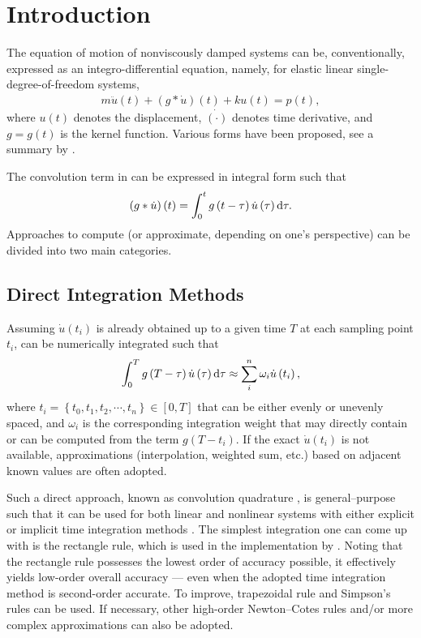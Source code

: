 \section{Introduction}
The equation of motion of nonviscously damped systems can be, conventionally, expressed as an integro-differential equation, namely, for elastic linear single-degree-of-freedom systems,
\begin{gather}\label{eq:single_eom}
m\ddot{u}\left(t\right)+\left(g*\dot{u}\right)\left(t\right)+ku\left(t\right)=p\left(t\right),
\end{gather}
where $u(t)$ denotes the displacement, $\dot{(\cdot)}$ denotes time derivative, and $g=g(t)$ is the kernel function. Various forms have been proposed, see a summary by \citet[][Table 1.1]{Adhikari2014}.

The convolution term in  can be expressed in integral form such that
\begin{gather}\label{eq:conv}
\left(g*\dot{u}\right)\left(t\right)=\int_0^tg\left(t-\tau\right)\dot{u}\left(\tau\right)\mathrm{d}\tau.
\end{gather}
Approaches to compute (or approximate, depending on one's perspective)  can be divided into two main categories.
\subsection{Direct Integration Methods}
Assuming $\dot{u}(t_i)$ is already obtained up to a given time $T$ at each sampling point $t_i$,  can be numerically integrated such that
\begin{gather}
\int_0^Tg\left(T-\tau\right)\dot{u}\left(\tau\right)\mathrm{d}\tau\approx\sum_i^n\omega_i\dot{u}\left(t_i\right),
\end{gather}
where $t_i=\left\{t_0,t_1,t_2,\cdots,t_n\right\}\in[0,T]$ that can be either evenly or unevenly spaced, and $\omega_i$ is the corresponding integration weight that may directly contain or can be computed \citep{Schaedle2006} from the term $g\left(T-t_i\right)$. If the exact $\dot{u}(t_i)$ is not available, approximations (interpolation, weighted sum, etc.) based on adjacent known values are often adopted.

Such a direct approach, known as convolution quadrature \citep{Lubich2004}, is general--purpose such that it can be used for both linear and nonlinear systems with either explicit or implicit time integration methods \citep[see, e.g.,][]{Katsikadelis2019}. The simplest integration one can come up with is the rectangle rule, which is used in the implementation by \citet{Puthanpurayil2014}. Noting that the rectangle rule possesses the lowest order of accuracy possible, it effectively yields low-order overall accuracy --- even when the adopted time integration method is second-order accurate. To improve, trapezoidal rule \citep[see][]{Liu2014} and Simpson's rules \citep[see][]{Shen2019} can be used. If necessary, other high-order Newton--Cotes rules and/or more complex approximations \citep{Schaedle2006,Shen2021} can also be adopted.

